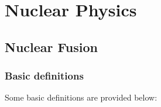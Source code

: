 \documentclass[../hedp.tex]{subfiles}
\begin{document}
\part{Nuclear Physics}

\chapter{Nuclear Fusion}

\section{Basic definitions}
Some basic definitions are provided below:
\end{document}
